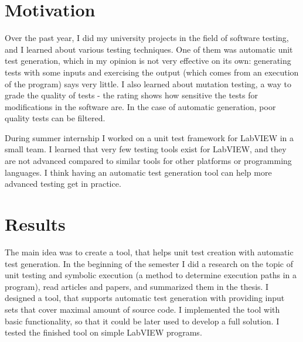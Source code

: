 \section{Motivation}
Over the past year, I did my university projects in the field of software testing, and I learned about various testing techniques. One of them was automatic unit test generation, which in my opinion is not very effective on its own: generating tests with some inputs and exercising the output (which comes from an execution of the program) says very little. I also learned about mutation testing, a way to grade the quality of tests - the rating shows how sensitive the tests for modifications in the software are. In the case of automatic generation, poor quality tests can be filtered.

During summer internship I worked on a unit test framework for LabVIEW in a small team. I learned that very few testing tools exist for LabVIEW, and they are not advanced compared to similar tools for other platforms or programming languages. I think having an automatic test generation tool can help more advanced testing get in practice.


\section{Results}
The main idea was to create a tool, that helps unit test creation with automatic test generation. In the beginning of the semester I did a research on the topic of unit testing and symbolic execution (a method to determine execution paths in a program), read articles and papers, and summarized them in the thesis. I designed a tool, that supports automatic test generation with providing input sets that cover maximal amount of source code. I implemented the tool with basic functionality, so that it could be later used to develop a full solution. I tested the finished tool on simple LabVIEW programs.

